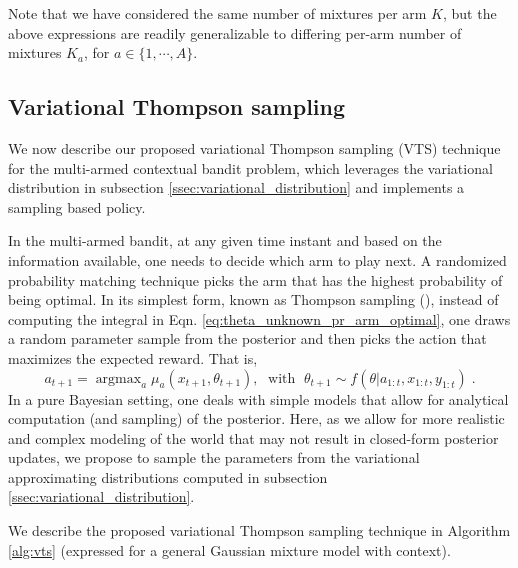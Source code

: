 \documentclass[10pt]{article}
\newcommand{\argmax}{\mathop{\mathrm{argmax}}}
\begin{document}
Note that we have considered the same number of mixtures per arm $K$, but the above expressions are readily 
generalizable
to differing per-arm number of mixtures $K_a$, for $a\in\{1, \cdots, A\}$.

\subsection{Variational Thompson sampling}
\label{ssec:variational_thompson_sampling}

We now describe our proposed variational Thompson sampling (VTS) technique for the multi-armed contextual bandit problem, which leverages the variational distribution in subsection \ref{ssec:variational_distribution} and implements a sampling based policy.

In the multi-armed bandit, at any given time instant and based on the information available, one needs to decide which arm to play next. A randomized probability matching technique picks the arm that has the highest probability of being optimal. In its simplest form, known as Thompson sampling (\cite{j-Thompson1935}), instead of computing the integral in Eqn. \ref{eq:theta_unknown_pr_arm_optimal}, one draws a random parameter sample from the posterior and then picks the action that maximizes the expected reward. That is, 
\begin{equation}
a_{t+1}=\argmax_{a}\mu_{a}(x_{t+1},\theta_{t+1}), \; \text{ with } \; \theta_{t+1} \sim f(\theta|a_{1:t}, x_{1:t}, y_{1:t}) \; .
\end{equation}
In a pure Bayesian setting, one deals with simple models that allow for analytical computation (and sampling) of the posterior. Here, as we allow for more realistic and complex modeling of the world that may not result in closed-form posterior updates, we propose to sample the parameters from the variational approximating distributions computed in subsection \ref{ssec:variational_distribution}.

We describe the proposed variational Thompson sampling technique in Algorithm \ref{alg:vts} (expressed for a general Gaussian mixture model with context).
\end{document}
